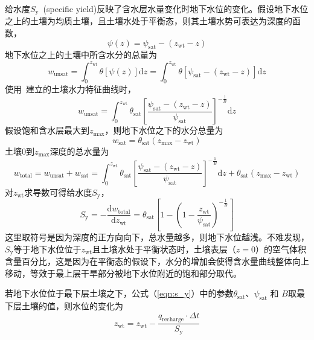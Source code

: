 给水度$S_{\mathrm {y}} $~(specific yield)反映了含水层水量变化时地下水位的变化。假设地下水位之上的土壤为均质土壤，且土壤水处于平衡态，则其土壤水势可表达为深度的函数，
\begin{equation}
  \psi \left(z\right) = \psi_{\mathrm {sat}}  - \left(z_{\mathrm{wt}} - z\right)
\end{equation}
地下水位之上的土壤中所含水分的总量为
\begin{equation}
  w_{\mathrm{unsat}} = \int^{z_{\mathrm{wt}}}_0 \theta\left[\psi\left(z\right)\right] \mathrm{d}z = \int^{z_{\mathrm{wt}}}_0 \theta\left[\psi_{\mathrm {sat}}  - \left(z_{\mathrm{wt}} - z\right)\right] \mathrm{d}z
\end{equation}
使用~\citet{campbell1974}建立的土壤水力特征曲线时，
\begin{equation}
  w_{\mathrm{unsat}} = \int^{z_{\mathrm{wt}}}_0 \theta_{\mathrm {sat}} \left[\frac{\psi_{\mathrm {sat}}  - \left(z_{\mathrm{wt}} - z\right)}{\psi_{\mathrm {sat}} }\right]^{-\frac{1}{B}} \mathrm{d}z
\end{equation}
假设饱和含水层最大到$z_{\mathrm{max}}$，则地下水位之下的水分总量为
\begin{equation}
  w_{\mathrm{sat}} = \theta_{\mathrm {sat}} \left(z_{\mathrm{max}}-z_{\mathrm{wt}}\right)
\end{equation}
土壤$0$到$z_{\mathrm{max}}$深度的总水量为
\begin{equation}
  w_{\mathrm{total}} = w_{\mathrm{unsat}} + w_{\mathrm{sat}} = \int^{z_{\mathrm{wt}}}_0 \theta_{\mathrm {sat}} \left[\frac{\psi_{\mathrm {sat}}  - \left(z_{\mathrm{wt}} - z\right)}{\psi_{\mathrm {sat}} }\right]^{-\frac{1}{B}} \mathrm{d}z + \theta_{\mathrm {sat}} \left(z_{\mathrm{max}}-z_{\mathrm{wt}}\right)
\end{equation}
对$z_{\mathrm{wt}}$求导数可得给水度$S_{\mathrm {y}} $，
\begin{equation}
  {S}_{\mathrm{{y}}} = -\frac{\mathrm{d} w_{\mathrm{total}}}{\mathrm{d} z_{\mathrm{wt}}} = \theta_{\mathrm{sat}}\left[1-\left(1-\frac{z_{\mathrm{w t}}}{\psi_{\mathrm{sat}}}\right)^{-\frac{1}{B}}\right] \label{eqn:s_y}
\end{equation}
这里取符号是因为深度的正方向向下，总水量越多，则地下水位越浅。不难发现，$S_{\mathrm {y}} $等于地下水位位于$z_{\mathrm{wt}}$且土壤水处于平衡状态时，土壤表层（$z=0$）的空气体积含量百分比，这是因为在平衡态的假设下，水分的增加会使得含水量曲线整体向上移动，等效于最上层干旱部分被地下水位附近的饱和部分取代。

若地下水位位于最下层土壤之下，公式（\ref{eqn:s_y}）中的参数$\theta_{\mathrm {sat}} $、$\psi_{\mathrm {sat}} $ 和 $B$取最下层土壤的值，则水位的变化为
\begin{equation}
  z_{\mathrm{w t}}=z_{\mathrm{w t}}-\frac{q_{\mathrm{recharge}} \cdot \Delta t}{S_{\mathrm{y}}}
\end{equation}

